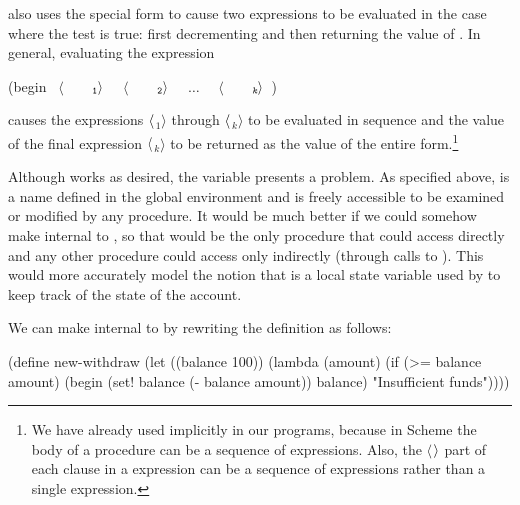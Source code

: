  also uses the  special form to cause two
expressions to be evaluated in the case where the  test is true: first
decrementing  and then returning the value of .  In
general, evaluating the expression

\begin{codeBlock}
(begin ~\(\langle \)~~~~\(_{\mono{1}}\rangle \)~ ~\(\langle \)~~~~\(_{\mono{2}}\rangle \)~ ~\( \dots \)~ ~\(\langle \)~~~~\(_{\monoItalic{k}}\rangle \)~)
\end{codeBlock}

\noindent
causes the expressions \( \langle\kern0.06em \)\( _1\rangle \) through \( \langle\kern0.06em \)\( _k\rangle \) to be evaluated
in sequence and the value of the final expression \( \langle\kern0.06em \)\( _k\rangle \) to be
returned as the value of the entire  form.\footnote{We have already
used  implicitly in our programs, because in Scheme the body of a
procedure can be a sequence of expressions.  Also, the \( \langle \)\( \kern0.06em\rangle \) part
of each clause in a  expression can be a sequence of expressions
rather than a single expression.}

Although  works as desired, the variable  presents
a problem.  As specified above,  is a name defined in the global
environment and is freely accessible to be examined or modified by any
procedure.  It would be much better if we could somehow make 
internal to , so that  would be the only
procedure that could access  directly and any other procedure
could access  only indirectly (through calls to ).
This would more accurately model the notion that  is a local
state variable used by  to keep track of the state of the
account.

We can make  internal to  by rewriting the
definition as follows:

\begin{codeBlock}
(define new-withdraw
  (let ((balance 100))
    (lambda (amount)
      (if (>= balance amount)
          (begin (set! balance (- balance amount))
                 balance)
          "Insufficient funds"))))
\end{codeBlock}

